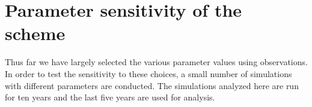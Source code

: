 \section{Parameter sensitivity of the scheme}
\label{sec:sensitivity}

\begin{table}
	\caption{Global and annual mean climatology from parameter sensitivity tests. In each test, only the parameter listed in the table header (see ) is changed from the default values. The units for cloud effective radius ($r_e$) and in-cloud liquid water mixing ratio ($w_l$) are $\mu$m and g kg$^{-1}$ respectively.}
	\centering
	\renewcommand{\arraystretch}{1.5}
	\label{tab:global_mean_climate_sensitivity}
\end{table}

Thus far we have largely selected the various parameter values using observations. In order to test the sensitivity to these choices, a small number of simulations with different parameters are conducted. The simulations analyzed here are run for ten years and the last five years are used for analysis.

